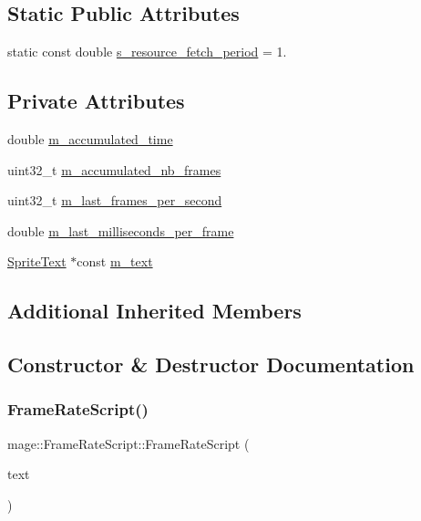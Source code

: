 \subsection*{Static Public Attributes}
\begin{DoxyCompactItemize}
\item 
static const double \hyperlink{classmage_1_1_frame_rate_script_ad28027c538faeab0c74bdb7b49f59469}{s\+\_\+resource\+\_\+fetch\+\_\+period} = 1.
\end{DoxyCompactItemize}
\subsection*{Private Attributes}
\begin{DoxyCompactItemize}
\item 
double \hyperlink{classmage_1_1_frame_rate_script_ad2811547f84f1c62392e36fd8b82042d}{m\+\_\+accumulated\+\_\+time}
\item 
uint32\+\_\+t \hyperlink{classmage_1_1_frame_rate_script_a96dc980d017ad5e1b1f00db2526cd576}{m\+\_\+accumulated\+\_\+nb\+\_\+frames}
\item 
uint32\+\_\+t \hyperlink{classmage_1_1_frame_rate_script_a6126772a3b500a0c044837f432d10976}{m\+\_\+last\+\_\+frames\+\_\+per\+\_\+second}
\item 
double \hyperlink{classmage_1_1_frame_rate_script_a648f07d3c0c140b311703cdb85c63435}{m\+\_\+last\+\_\+milliseconds\+\_\+per\+\_\+frame}
\item 
\hyperlink{classmage_1_1_sprite_text}{Sprite\+Text} $\ast$const \hyperlink{classmage_1_1_frame_rate_script_ae54fff9f8485d86c664057fa8d001bf9}{m\+\_\+text}
\end{DoxyCompactItemize}
\subsection*{Additional Inherited Members}


\subsection{Constructor \& Destructor Documentation}
\hypertarget{classmage_1_1_frame_rate_script_a78ffb9aa23f42244ef34bd2dfaa7c537}{}\label{classmage_1_1_frame_rate_script_a78ffb9aa23f42244ef34bd2dfaa7c537} 
\subsubsection{\texorpdfstring{Frame\+Rate\+Script()}{FrameRateScript()}\hspace{0.1cm}{\footnotesize\ttfamily [1/3]}}
{\footnotesize\ttfamily mage\+::\+Frame\+Rate\+Script\+::\+Frame\+Rate\+Script (\begin{DoxyParamCaption}\item[{\hyperlink{classmage_1_1_sprite_text}{Sprite\+Text} $\ast$}]{text }\end{DoxyParamCaption})\hspace{0.3cm}{\ttfamily [explicit]}}

